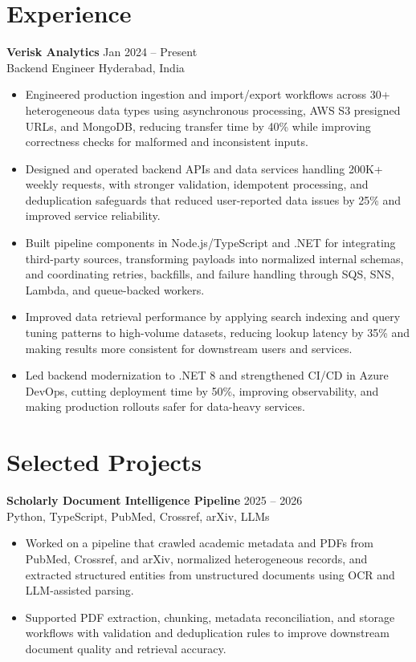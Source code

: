 \documentclass[10pt,letterpaper]{article}
\newcommand{\resumeSubheading}[4]{%
  \textbf{#1} \hfill #2 \\
  #3 \hfill #4 \\
}
\begin{document}
\section*{Experience}
\resumeSubheading{Verisk Analytics}{Jan 2024 -- Present}{Backend Engineer}{Hyderabad, India}
\begin{itemize}
    \item Engineered production ingestion and import/export workflows across 30+ heterogeneous data types using asynchronous processing, AWS S3 presigned URLs, and MongoDB, reducing transfer time by 40\% while improving correctness checks for malformed and inconsistent inputs.
    \item Designed and operated backend APIs and data services handling 200K+ weekly requests, with stronger validation, idempotent processing, and deduplication safeguards that reduced user-reported data issues by 25\% and improved service reliability.
    \item Built pipeline components in Node.js/TypeScript and .NET for integrating third-party sources, transforming payloads into normalized internal schemas, and coordinating retries, backfills, and failure handling through SQS, SNS, Lambda, and queue-backed workers.
    \item Improved data retrieval performance by applying search indexing and query tuning patterns to high-volume datasets, reducing lookup latency by 35\% and making results more consistent for downstream users and services.
    \item Led backend modernization to .NET 8 and strengthened CI/CD in Azure DevOps, cutting deployment time by 50\%, improving observability, and making production rollouts safer for data-heavy services.
\end{itemize}

\section*{Selected Projects}
\resumeSubheading{Scholarly Document Intelligence Pipeline}{2025 -- 2026}{}{Python, TypeScript, PubMed, Crossref, arXiv, LLMs}
\begin{itemize}
    \item Worked on a pipeline that crawled academic metadata and PDFs from PubMed, Crossref, and arXiv, normalized heterogeneous records, and extracted structured entities from unstructured documents using OCR and LLM-assisted parsing.
    \item Supported PDF extraction, chunking, metadata reconciliation, and storage workflows with validation and deduplication rules to improve downstream document quality and retrieval accuracy.
\end{itemize}
\end{document}
